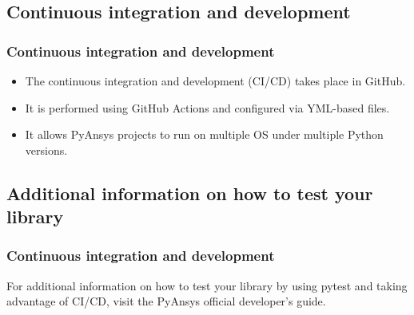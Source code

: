 \documentclass[t]{beamer}
\begin{document}
\subsection{Continuous integration and development}
\begin{frame}[fragile=singleslide]
  \frametitle{Continuous integration and development}

   \begin{itemize}
        \item The continuous integration and development (CI/CD) takes place in GitHub.
        \item It is performed using GitHub Actions and configured via YML-based files.
        \item It allows PyAnsys projects to run on multiple OS under multiple Python versions.
   \end{itemize}

\end{frame}


\subsection{Additional information on how to test your library}
\begin{frame}[fragile=singleslide]
  \frametitle{Continuous integration and development}

        For additional information on how to test your library by using pytest
        and taking advantage of CI/CD, visit the PyAnsys official developer's
        guide.

\end{frame}





\lastframe{}
\end{document}
